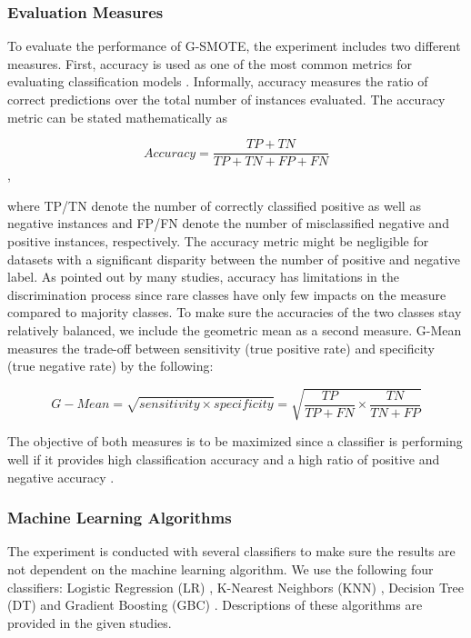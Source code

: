 \documentclass[parskip=full]{scrartcl}
\begin{document}
\subsubsection{Evaluation Measures}

To evaluate the performance of G-SMOTE, the experiment includes two different measures. First, accuracy is used as one of the most common metrics for evaluating classification models \cite{M.2015}. Informally, accuracy measures the ratio of correct predictions over the total number of instances evaluated. The accuracy metric can be stated mathematically as

\[Accuracy = \frac{TP + TN}{TP + TN + FP + FN}\],

where TP/TN denote the number of correctly classified positive as well as negative instances and FP/FN denote the number of misclassified negative and positive instances, respectively. The accuracy metric might be negligible for datasets with a significant disparity between the number of positive and negative label. As pointed out by many studies, accuracy has limitations in the discrimination process since rare classes have only few impacts on the measure compared to majority classes. To make sure the accuracies of the two classes stay relatively balanced, we include the geometric mean as a second measure. G-Mean measures the trade-off between sensitivity (true positive rate) and specificity (true negative rate) by the following:

\[G-Mean = \sqrt{sensitivity \times specificity} = \sqrt{\dfrac{TP}{TP + FN} \times \dfrac{TN}{TN + FP}}\]

The objective of both measures is to be maximized since a classifier is performing well if it provides high classification accuracy and a high ratio of positive and negative accuracy \cite{Han.2012}. 

\subsubsection{Machine Learning Algorithms}

The experiment is conducted with several classifiers to make sure the results are not dependent on the machine learning algorithm. We use the following four classifiers: Logistic Regression (LR) \cite{McCullagh.2019}, K-Nearest Neighbors (KNN) \cite{Cover.1967}, Decision Tree (DT) \cite{Salzberg.1994} and Gradient Boosting (GBC) \cite{Friedman.2001}. Descriptions of these algorithms are provided in the given studies.
\end{document}
